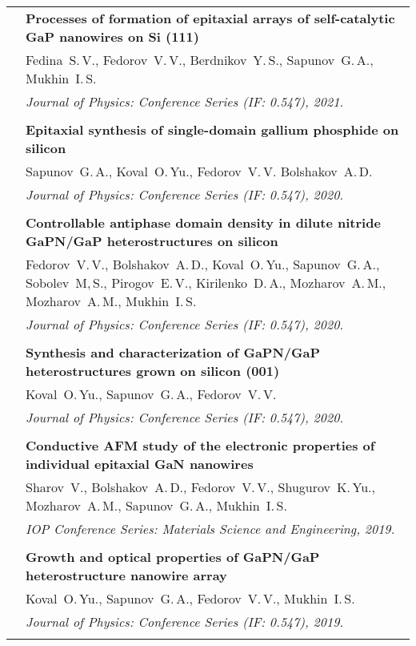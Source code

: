 \documentclass[letterpaper, 11pt]{article}
\begin{document}
\begin{longtable}{p{1.3in}p{4.8in}}
        & \textbf{Processes of formation of epitaxial arrays of self-catalytic
        GaP nanowires on Si (111)} \\
        & Fedina~S.\,V., Fedorov~V.\,V., Berdnikov~Y.\,S., Sapunov~G.\,A.,
        Mukhin~I.\,S. \\
        & \textit{Journal of Physics: Conference Series (IF: 0.547), 2021.}\\
		& \\
		
        & \textbf{Epitaxial synthesis of single-domain gallium phosphide on
        silicon} \\
        & Sapunov~G.\,A., Koval~O.\,Yu., Fedorov~V.\,V. Bolshakov~A.\,D. \\
        & \textit{Journal of Physics: Conference Series (IF: 0.547), 2020.}\\
		& \\
		
        & \textbf{Controllable antiphase domain density in dilute nitride
        GaPN/GaP heterostructures on silicon} \\
        & Fedorov~V.\,V., Bolshakov~A.\,D., Koval~O.\,Yu., Sapunov~G.\,A.,
        Sobolev~M,\,S., Pirogov~E.\,V., Kirilenko~D.\,A., Mozharov~A.\,M.,
        Mozharov~A.\,M., Mukhin~I.\,S. \\
        & \textit{Journal of Physics: Conference Series (IF: 0.547), 2020.}\\
		& \\
		
        & \textbf{Synthesis and characterization of GaPN/GaP heterostructures
        grown on silicon (001)} \\
        & Koval~O.\,Yu., Sapunov~G.\,A., Fedorov~V.\,V. \\
        & \textit{Journal of Physics: Conference Series (IF: 0.547), 2020.}\\
		& \\
		
        & \textbf{Conductive AFM study of the electronic properties of
        individual epitaxial GaN nanowires} \\
        & Sharov~V., Bolshakov~A.\,D., Fedorov~V.\,V., Shugurov~K.\,Yu.,
        Mozharov~A.\,M., Sapunov~G.\,A., Mukhin~I.\,S. \\
		& \textit{IOP Conference Series: Materials Science and Engineering, 2019.}\\
		& \\
		
        & \textbf{Growth and optical properties of GaPN/GaP heterostructure
        nanowire array} \\
        & Koval~O.\,Yu., Sapunov~G.\,A., Fedorov~V.\,V., Mukhin~I.\,S. \\
		& \textit{Journal of Physics: Conference Series (IF: 0.547), 2019.}\\
		& \\
		

\end{longtable}
\end{document}
